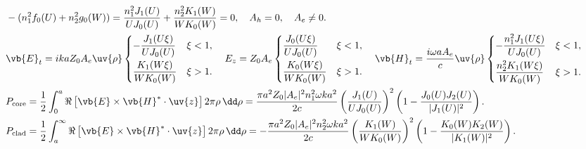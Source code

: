 \begin{align*}
	&-(n_1^2 f_0(U) + n_2^2 g_0(W)) = \dfrac{n_1^2 J_1(U)}{U J_0(U)} + \dfrac{n_2^2 K_1(W)}{W K_0(W)} = 0, \quad A_h = 0, \quad A_e \neq 0.\\
	&\vb{E}_t = i k a Z_0 A_e \uv{\rho}
	\begin{cases}
		-\dfrac{J_1(U\xi)}{U J_0(U)} & \xi < 1, \\[8pt]
		\dfrac{K_1(W\xi)}{W K_0(W)}  & \xi > 1.
	\end{cases}
	\quad
	E_z = Z_0 A_e
	\begin{cases}
		\dfrac{J_0(U\xi)}{U J_0(U)} & \xi < 1, \\[8pt]
		\dfrac{K_0(W\xi)}{W K_0(W)} & \xi > 1.
	\end{cases}
	\quad
	\vb{H}_t = \dfrac{i \omega a A_e}{c} \uv{\rho}
	\begin{cases}
		-\dfrac{n_1^2 J_1(U\xi)}{U J_0(U)} & \xi < 1, \\[8pt]
		\dfrac{n_2^2 K_1(W\xi)}{W K_0(W)}  & \xi > 1.
	\end{cases}\\
	&P_{\text{core}} = \dfrac{1}{2} \int_0^a \Re\left[ \vb{E} \times \vb{H}^* \cdot \uv{z} \right] 2\pi \rho \, \dd \rho = \dfrac{\pi a^2 Z_0 |A_e|^2 n_1^2 \omega k a^2}{2 c} \left( \dfrac{J_1(U)}{U J_0(U)} \right)^2 \left( 1 - \dfrac{J_0(U) J_2(U)}{|J_1(U)|^2} \right).\\
	&P_{\text{clad}} = \dfrac{1}{2} \int_a^\infty \Re\left[ \vb{E} \times \vb{H}^* \cdot \uv{z} \right] 2\pi \rho \, \dd \rho = -\dfrac{\pi a^2 Z_0 |A_e|^2 n_2^2 \omega k a^2}{2 c} \left( \dfrac{K_1(W)}{W K_0(W)} \right)^2 \left( 1 - \dfrac{K_0(W) K_2(W)}{|K_1(W)|^2} \right).
\end{align*}


